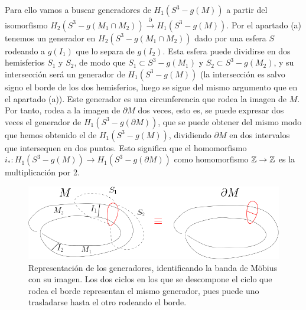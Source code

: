 \documentclass[twoside]{article}
\begin{document}
\begin{solucion}
\begin{enumerate}[(a)]
Para ello vamos a buscar generadores de $H_1(S^3-g(M))$ a partir del isomorfismo $H_2(S^3-g(M_1\cap M_2))\xrightarrow{\partial}H_1(S^3-g(M))$. Por el apartado (a) tenemos un generador en $H_2(S^3-g(M_1\cap M_2))$ dado por una esfera $S$ rodeando a $g(I_1)$ que lo separa de $g(I_2)$. Esta esfera puede dividirse en dos hemisferios $S_1$ y $S_2$, de modo que $S_1\subset S^3-g(M_1)$ y $S_2\subset S^3-g(M_2)$, y su intersección será un generador de $H_1(S^3-g(M))$ (la intersección es salvo signo el borde de los dos hemisferios, luego se sigue del mismo argumento que en el apartado (a)). Este generador es una circunferencia que rodea la imagen de $M$. Por tanto, rodea a la imagen de $\partial M$ dos veces, esto es, se puede expresar dos veces el generador de $H_1(S^3-g(\partial M))$, que se puede obtener del mismo modo que hemos obtenido el de $H_1(S^3-g(M))$, dividiendo $\partial M$ en dos intervalos que intersequen en dos puntos. Esto significa que el homomorfismo $i_*:H_1(S^3-g(M))\to H_1(S^3-g(\partial M))$ como homomorfismo $\mathbb{Z}\to\mathbb{Z}$ es la multiplicación por 2. 


\begin{figure}[h!]
\includegraphics[scale=0.6]{generador}
\caption{Representación de los generadores, identificando la banda de Möbius con su imagen. Los dos ciclos en los que se descompone el ciclo que rodea el borde representan el mismo generador, pues puede uno trasladarse hasta el otro rodeando el borde.}
\end{figure}








\end{enumerate}
\end{solucion}
\end{document}

